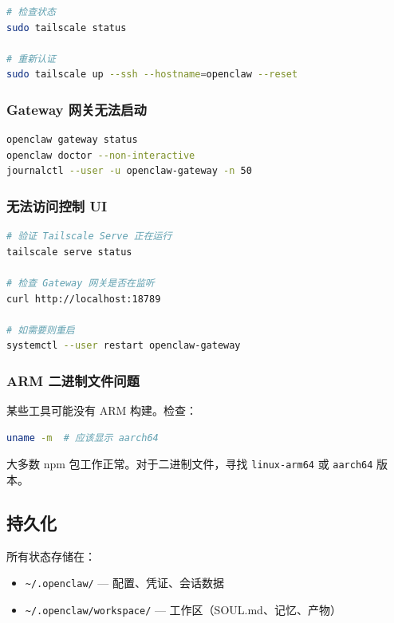\begin{lstlisting}[language=bash]
# 检查状态
sudo tailscale status

# 重新认证
sudo tailscale up --ssh --hostname=openclaw --reset
\end{lstlisting}


\subsubsection{Gateway 网关无法启动}


\begin{lstlisting}[language=bash]
openclaw gateway status
openclaw doctor --non-interactive
journalctl --user -u openclaw-gateway -n 50
\end{lstlisting}


\subsubsection{无法访问控制 UI}


\begin{lstlisting}[language=bash]
# 验证 Tailscale Serve 正在运行
tailscale serve status

# 检查 Gateway 网关是否在监听
curl http://localhost:18789

# 如需要则重启
systemctl --user restart openclaw-gateway
\end{lstlisting}


\subsubsection{ARM 二进制文件问题}


某些工具可能没有 ARM 构建。检查：

\begin{lstlisting}[language=bash]
uname -m  # 应该显示 aarch64
\end{lstlisting}


大多数 npm 包工作正常。对于二进制文件，寻找 \texttt{linux-arm64} 或 \texttt{aarch64} 版本。

\hrulefill


\subsection{持久化}


所有状态存储在：

\begin{itemize}
  \item \texttt{\textasciitilde{}/.openclaw/} — 配置、凭证、会话数据
  \item \texttt{\textasciitilde{}/.openclaw/workspace/} — 工作区（SOUL.md、记忆、产物）
\end{itemize}


